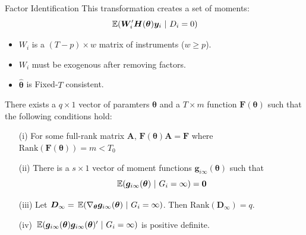 \documentclass[aspectratio=169,t,11pt]{beamer}
\begin{document}
\begin{frame}{Factor Identification}
  This transformation creates a set of moments:
  $$
    \expec{\bm{W}_i' \bm{H}(\bm{\theta}) \bm{y}_i}{D_i = 0}
  $$

  \begin{itemize}
    \item $W_i$ is a $(T - p) \times w$ matrix of instruments ($w \geq p$).
    \item $W_i$ must be exogenous after removing factors.
    \item $\hat{\bm{\theta}}$ is Fixed-$T$ consistent.
  \end{itemize}

\end{frame}

\begin{frame}\label{slide:appendix-general_factor}
  \begin{block}{}

    There exists a $q \times 1$ vector of paramters $\bm{\theta}$ and a $T \times m$ function $\bm{F}(\bm{\theta})$ such that the following conditions hold:
    \begin{enumerate}
      \item[(i)] For some full-rank matrix $\bm{A}$, $\bm{F}(\bm{\theta}) \bm{A} = \bm{F}$ where $\text{Rank}(\bm{F}(\bm{\theta})) = m < T_0$ 
      \item[(ii)] There is a $s \times 1$ vector of moment functions $\bm g_{i\infty}(\bm{\theta})$ such that 
      \begin{equation*}\label{eq:factor_moments}
        \expec{\bm g_{i\infty}(\bm{\theta})}{G_i = \infty} = \bm 0
      \end{equation*}
      
      \item[(iii)] Let $\bm D_{\infty} = \expec{\nabla_{\bm{\theta}} \bm g_{i \infty}(\bm{\theta})}{G_i = \infty}$. Then $\text{Rank}(\bm D_{\infty}) = q$.
      \item[(iv)] $\expec{\bm g_{i \infty}(\bm{\theta}) \bm g_{i \infty}(\bm{\theta})'}{G_i = \infty}$ is positive definite. 
    \end{enumerate}
  \end{block}
\end{frame}
\end{document}
